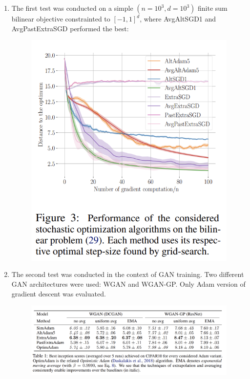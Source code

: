 \documentclass[11pt]{article}
\begin{document}
	\begin{enumerate}
		\item The first test was conducted on a simple $(n=10^3,d=10^3)$ finite sum bilinear objective constrainted to $[-1,1]^d$, where AvgAltSGD1 and AvgPastExtraSGD performed the best:
		\begin{figure}[!htb]
			\centering
			\includegraphics[scale=1]{pictures/pic3.png}
			\label{fig:la}
		\end{figure}
		\item The second test was conducted in the context of GAN training. Two different GAN architectures were used: WGAN and WGAN-GP. Only Adam version of gradient descent was evaluated. \\
		\begin{figure}[!htb]
			\centering
			\includegraphics[scale=1]{pictures/pic4.png}

\end{figure}
\end{enumerate}
\end{document}
